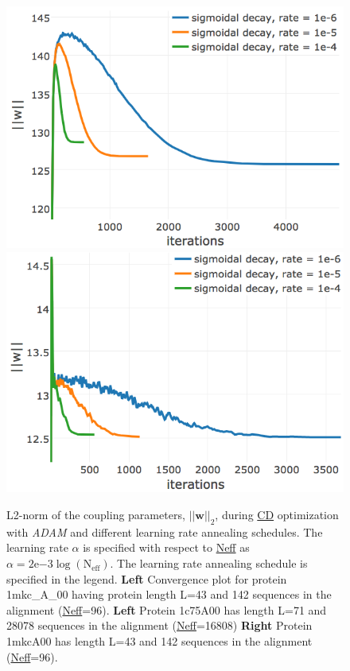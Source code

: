 \documentclass[11pt,a4paper,twoside]{book}
\newcommand{\w}{\mathbf{w}}
\theoremstyle{definition}
\theoremstyle{definition}
\theoremstyle{remark}
\begin{document}
\begin{figure}

{\centering \includegraphics[width=0.48\linewidth]{img/full_likelihood/adam/1c75A00_decaying_learningrates_parameternorm} \includegraphics[width=0.48\linewidth]{img/full_likelihood/adam/1mkcA00_decaying_learningrates_parameternorm} 

}

\caption{L2-norm of the coupling
parameters, \(||\w||_2\), during \protect\hyperlink{abbrev}{CD}
optimization with \emph{ADAM} and different learning rate annealing
schedules. The learning rate \(\alpha\) is specified with respect to
\protect\hyperlink{abbrev}{Neff} as
\(\alpha = 2\mathrm{e}{-3}\log(\text{N}_{\text{eff}})\). The learning
rate annealing schedule is specified in the legend. \textbf{Left}
Convergence plot for protein 1mkc\_A\_00 having protein length L=43 and
142 sequences in the alignment (\protect\hyperlink{abbrev}{Neff}=96).
\textbf{Left} Protein 1c75A00 has length L=71 and 28078 sequences in the
alignment (\protect\hyperlink{abbrev}{Neff}=16808) \textbf{Right}
Protein 1mkcA00 has length L=43 and 142 sequences in the alignment
(\protect\hyperlink{abbrev}{Neff}=96).}\label{fig:adam-learning-rate-annealing}
\end{figure}
\end{document}
